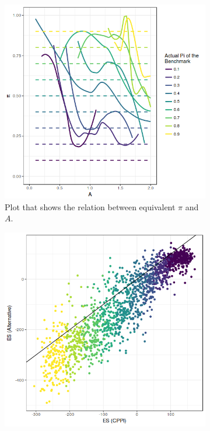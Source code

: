 
\begin{figure}
\centering
\begin{subfigure}{.5\textwidth}
    \centering
    \includegraphics[scale=0.5]{./images/pi-a_mort2.png}
    \caption{Plot that shows the relation between equivalent $\pi$ and $A$.}
    \label{fig:pi-a_mort}
\end{subfigure}%
\begin{subfigure}{.5\textwidth}
    \centering
    \includegraphics[scale=0.5]{./images/es-es_mort_new.png}

\end{subfigure}
\end{figure}
